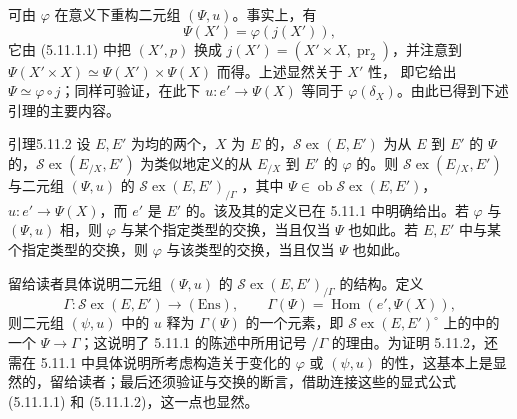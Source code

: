 可由 $\varphi$ 在意义下重构二元组 $(\Psi,u)$。事实上，有
\[\Psi(X')=\varphi(j(X')),\tag{5.11.1.2}\]
它由 (5.11.1.1) 中把 $(X',p)$ 换成 $j(X')=(X'\times X,\operatorname{pr}_2)$，并注意到 $\Psi(X'\times X)\simeq\Psi(X')\times\Psi(X)$ 而得。上述显然关于 $X'$ 性，
即它给出 $\Psi\simeq\varphi\circ j$；同样可验证，在此下 $u:e'\to\Psi(X)$ 等同于 $\varphi(\delta_X)$。由此已得到下述引理的主要内容。

\begin{SGAresult}{引理}{5.11.2}
设 $E,E'$ 为均的两个，$X$ 为 $E$ 的，$\mathscr{S}\!\operatorname{ex}(E,E')$ 为从 $E$ 到 $E'$ 的 $\Psi$ 的，$\mathscr{S}\!\operatorname{ex}(E_{/X},E')$ 为类似地定义的从 $E_{/X}$ 到 $E'$ 的 $\varphi$ 的。则 $\mathscr{S}\!\operatorname{ex}(E_{/X},E')$ 与二元组 $(\Psi,u)$ 的 $\mathscr{S}\!\operatorname{ex}(E,E')_{/\Gamma}$ ，其中 $\Psi\in\operatorname{ob}\mathscr{S}\!\operatorname{ex}(E,E')$，$u:e'\to\Psi(X)$，而 $e'$ 是 $E'$ 的。该及其的定义已在 5.11.1 中明确给出。若 $\varphi$ 与 $(\Psi,u)$ 相，则 $\varphi$ 与某个指定类型的交换，当且仅当 $\Psi$ 也如此。若 $E,E'$ 中与某个指定类型的交换，则 $\varphi$ 与该类型的交换，当且仅当 $\Psi$ 也如此。
\end{SGAresult}

留给读者具体说明二元组 $(\Psi,u)$ 的 $\mathscr{S}\!\operatorname{ex}(E,E')_{/\Gamma}$ 的结构。定义
\[\Gamma:\mathscr{S}\!\operatorname{ex}(E,E')\to(\mathrm{Ens}),\qquad\Gamma(\Psi)=\operatorname{Hom}(e',\Psi(X)),\]
则二元组 $(\psi,u)$ 中的 $u$ 释为 $\Gamma(\Psi)$ 的一个元素，即 $\mathscr{S}\!\operatorname{ex}(E,E')^\circ$ 上的中的一个 $\Psi\to\Gamma$；这说明了 5.11.1 的陈述中所用记号 $/\Gamma$ 的理由。为证明 5.11.2，还需在 5.11.1 中具体说明所考虑构造关于变化的 $\varphi$ 或 $(\psi,u)$ 的性，这基本上是显然的，留给读者；最后还须验证与交换的断言，借助连接这些的显式公式 (5.11.1.1) 和 (5.11.1.2)，这一点也显然。

